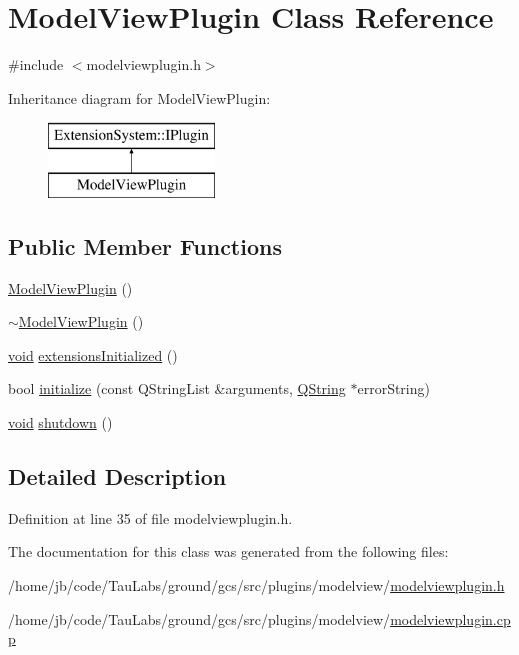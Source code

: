 \hypertarget{class_model_view_plugin}{\section{\-Model\-View\-Plugin \-Class \-Reference}
\label{class_model_view_plugin}
}


{\ttfamily \#include $<$modelviewplugin.\-h$>$}

\-Inheritance diagram for \-Model\-View\-Plugin\-:\begin{figure}[H]
\begin{center}
\leavevmode
\includegraphics[height=2.000000cm]{class_model_view_plugin}
\end{center}
\end{figure}
\subsection*{\-Public \-Member \-Functions}
\begin{DoxyCompactItemize}
\item 
\hyperlink{group___model_view_plugin_gafbc74cc8c17048cddb875add75e65cad}{\-Model\-View\-Plugin} ()
\item 
\hyperlink{group___model_view_plugin_gac1d370684cf595a557c80ee2d6572e39}{$\sim$\-Model\-View\-Plugin} ()
\item 
\hyperlink{group___u_a_v_objects_plugin_ga444cf2ff3f0ecbe028adce838d373f5c}{void} \hyperlink{group___model_view_plugin_gaf0ae0222c081f943759de1e0697df04e}{extensions\-Initialized} ()
\item 
bool \hyperlink{group___model_view_plugin_ga6f9214b4e1b72063475d8351046df6bb}{initialize} (const \-Q\-String\-List \&arguments, \hyperlink{group___u_a_v_objects_plugin_gab9d252f49c333c94a72f97ce3105a32d}{\-Q\-String} $\ast$error\-String)
\item 
\hyperlink{group___u_a_v_objects_plugin_ga444cf2ff3f0ecbe028adce838d373f5c}{void} \hyperlink{group___model_view_plugin_gad3a367fabe72d1e3a0063267d0170df9}{shutdown} ()
\end{DoxyCompactItemize}


\subsection{\-Detailed \-Description}


\-Definition at line 35 of file modelviewplugin.\-h.



\-The documentation for this class was generated from the following files\-:\begin{DoxyCompactItemize}
\item 
/home/jb/code/\-Tau\-Labs/ground/gcs/src/plugins/modelview/\hyperlink{modelviewplugin_8h}{modelviewplugin.\-h}\item 
/home/jb/code/\-Tau\-Labs/ground/gcs/src/plugins/modelview/\hyperlink{modelviewplugin_8cpp}{modelviewplugin.\-cpp}\end{DoxyCompactItemize}
